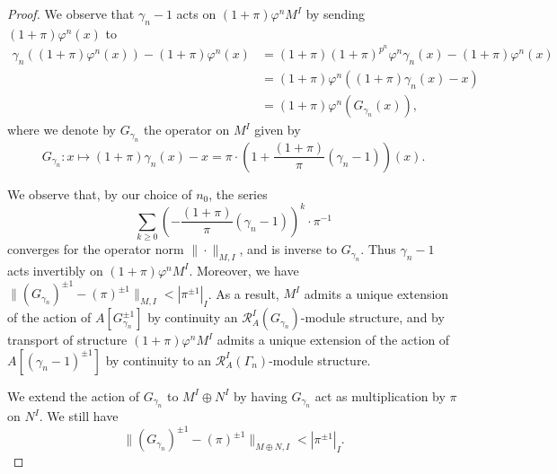 \documentclass[12pt]{article}
\theoremstyle{definition}
\numberwithin{equation}{theorem}
\newcommand{\calR}{\mathcal{R}}
\begin{document}
\begin{proof}
We observe that $\gamma_n-1$ acts on $(1+\pi)\varphi^n M^I$ by sending $(1+\pi)\varphi^n(x)$ to
\begin{align*}
\gamma_n((1+\pi)\varphi^n(x)) - (1+\pi)\varphi^n(x)
&= (1+\pi)(1+\pi)^{p^n}\varphi^n\gamma_n(x) - (1+\pi)\varphi^n(x) \\
&= (1+\pi)\varphi^n((1+\pi)\gamma_n(x)-x) \\
&= (1+\pi)\varphi^n(G_{\gamma_n}(x)),
\end{align*}
where we denote by $G_{\gamma_n}$ the operator on $M^I$ given by
\[
G_{\gamma_n} : x \mapsto (1+\pi)\gamma_n(x)-x = \pi \cdot
\left(1 + \frac{(1+\pi)}{\pi}(\gamma_n-1)\right)(x).
\]

We observe that, by
our choice of $n_0$, the series
\[
\sum_{k \geq 0} \left( -\frac{(1+\pi)}{\pi} (\gamma_n-1)
  \right)^k \cdot \pi^{-1}
\]
converges for the operator norm $\|\cdot\|_{M,I}$, and is inverse to
$G_{\gamma_n}$.  Thus $\gamma_n-1$ acts invertibly on
$(1+\pi)\varphi^nM^I$.  Moreover, we have $\|(G_{\gamma_n})^{\pm
  1}-(\pi)^{\pm1}\|_{M,I} < |\pi^{\pm1}|_I$.  As a result, $M^I$
admits a unique extension of the action of $A[G_{\gamma_n}^{\pm 1}]$
by continuity an $\calR_A^I(G_{\gamma_n})$-module structure, and by
transport of structure $(1+\pi)\varphi^n M^I$ admits a unique
extension of the action of $A[(\gamma_n-1)^{\pm1}]$ by continuity to
an $\calR_A^I(\Gamma_n)$-module structure.


We extend the action of $G_{\gamma_n}$ to $M^I\oplus N^I$ by having
$G_{\gamma_n}$ act as multiplication by $\pi$ on $N^I$.  We still have
\begin{equation}\label{E:norm condition}
\|(G_{\gamma_n})^{\pm 1}-(\pi)^{\pm1}\|_{M \oplus N,I} < |\pi^{\pm1}|_I.
\end{equation}


\end{proof}
\end{document}
